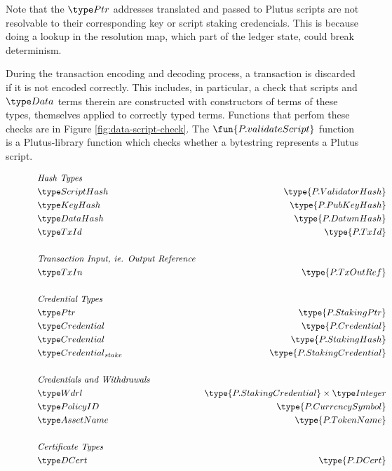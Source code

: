 Note that the $\Ptr$ addresses translated and passed to Plutus scripts are
not resolvable to their corresponding key or script staking credencials. This
is because doing a lookup in the resolution map, which part of the ledger state,
could break determinism.

During the transaction encoding and decoding process, a transaction is discarded if it is not
encoded correctly. This includes, in particular, a check that scripts and $\Data$
terms therein are constructed with constructors of terms of these types, themselves
applied to correctly typed terms. Functions that perfom these checks are
in Figure \ref{fig:data-script-check}. The $\fun{P.validateScript}$ function
is a Plutus-library function which checks whether a bytestring represents a
Plutus script.

\begin{figure*}[htb]
  \begin{align*}
    & \emph{Hash Types} \\
    & \ScriptHash & \type{P.ValidatorHash} \\
    & \KeyHash & \type{P.PubKeyHash} \\
    & \DataHash & \type{P.DatumHash} \\
    & \TxId & \type{P.TxId} \\
    ~\\
    & \emph{Transaction Input, ie. Output Reference}  \\
    & \TxIn & \type{P.TxOutRef} \\
    ~\\
    & \emph{Credential Types} \\
    & \Ptr & \type{P.StakingPtr} \\
    & \Credential & \type{P.Credential} \\
    & \Credential & \type{P.StakingHash} \\
    & \StakeCredential & \type{P.StakingCredential} \\
    ~\\
    & \emph{Credentials and Withdrawals} \\
    & \Wdrl & \type{P.StakingCredential} \times \Integer \\
    & \PolicyID & \type{P.CurrencySymbol} \\
    & \AssetName & \type{P.TokenName} \\
    ~\\
    & \emph{Certificate Types} \\
    & \DCert & \type{P.DCert} \\

\end{align*}
\end{figure*}
